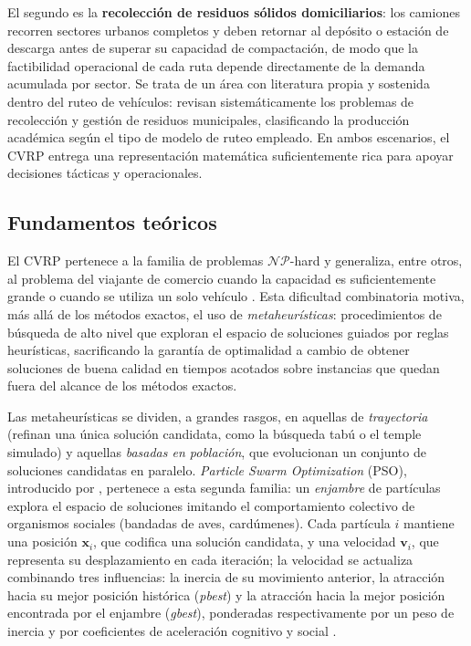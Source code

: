El segundo es la \textbf{recolección de residuos sólidos domiciliarios}: los camiones
recorren sectores urbanos completos y deben retornar al depósito o estación de descarga
antes de superar su capacidad de compactación, de modo que la factibilidad operacional de
cada ruta depende directamente de la demanda acumulada por sector. Se trata de un área con
literatura propia y sostenida dentro del ruteo de vehículos: \textcite{belien2014municipal}
revisan sistemáticamente los problemas de recolección y gestión de residuos municipales,
clasificando la producción académica según el tipo de modelo de ruteo empleado. En ambos
escenarios, el CVRP entrega una representación matemática suficientemente rica para apoyar
decisiones tácticas y operacionales.

\subsection{Fundamentos teóricos}

El CVRP pertenece a la familia de problemas $\mathcal{NP}$-hard y generaliza, entre
otros, al problema del viajante de comercio cuando la capacidad es suficientemente
grande o cuando se utiliza un solo vehículo \parencite{lenstra1981complexity}. Esta
dificultad combinatoria motiva, más allá de los métodos exactos, el uso de
\textit{metaheurísticas}: procedimientos de búsqueda de alto nivel que exploran el
espacio de soluciones guiados por reglas heurísticas, sacrificando la garantía de
optimalidad a cambio de obtener soluciones de buena calidad en tiempos acotados sobre
instancias que quedan fuera del alcance de los métodos exactos.

Las metaheurísticas se dividen, a grandes rasgos, en aquellas de \textit{trayectoria}
(refinan una única solución candidata, como la búsqueda tabú o el temple simulado) y
aquellas \textit{basadas en población}, que evolucionan un conjunto de soluciones
candidatas en paralelo. \textit{Particle Swarm Optimization} (PSO), introducido por
\textcite{kennedy1995particle}, pertenece a esta segunda familia: un \textit{enjambre}
de partículas explora el espacio de soluciones imitando el comportamiento colectivo de
organismos sociales (bandadas de aves, cardúmenes). Cada partícula $i$ mantiene una
posición $\mathbf{x}_i$, que codifica una solución candidata, y una velocidad
$\mathbf{v}_i$, que representa su desplazamiento en cada iteración; la velocidad se
actualiza combinando tres influencias: la inercia de su movimiento anterior, la
atracción hacia su mejor posición histórica (\textit{pbest}) y la atracción hacia la
mejor posición encontrada por el enjambre (\textit{gbest}), ponderadas respectivamente
por un peso de inercia y por coeficientes de aceleración cognitivo y social
\parencite{poli2007particle}.

